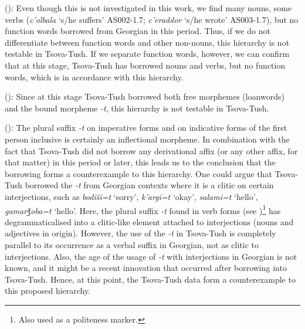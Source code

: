 \begin{description}[font=\normalfont]
	\item[\emph{Nouns > non-nouns, function words}] (\cite[208]{matras2011universals}): Even though this is not investigated in this work, we find many nouns, some verbs (\textit{c'olbala} `s/he suffers' AS002-1.7; \textit{c'eraddor} `s/he wrote' AS003-1.7), but no function words borrowed from Georgian in this period. Thus, if we do not differentiate between function words and other non-nouns, this hierarchy is not testable in Tsova-Tush. If we separate function words, however, we can confirm that at this stage, Tsova-Tush has borrowed nouns and verbs, but no function words, which is in accordance with this hierarchy.
	
	\item[\emph{Free morphemes > bound morphemes}]  (\cite[208]{matras2011universals}): Since at this stage Tsova-Tush borrowed both free morphemes (loanwords) and the bound morpheme \textit{-t}, this hierarchy is not testable in Tsova-Tush.
	
	\item[\emph{Derivational morphology > inflectional morphology}] (\cite[208]{matras2011universals}): The plural suffix \textit{-t} on imperative forms and on indicative forms of the first person inclusive is certainly an inflectional morpheme. In combination with the fact that Tsova-Tush did not borrow any derivational affix (or any other affix, for that matter) in this period or later, this leads us to the conclusion that the borrowing forms a counterexample to this hierarchy. One could argue that Tsova-Tush borrowed the \textit{-t} from Georgian contexts where it is a clitic on certain interjections, such as \textit{bodiši=t} `sorry', \textit{k'argi=t} `okay', \textit{salami=t} `hello', \textit{gamarǯoba=t} `hello'. Here, the plural suffix \textit{-t} found in verb forms (see )\footnote{Also used as a politeness marker.} has degrammaticalised into a clitic-like element attached to interjections (nouns and adjectives in origin). However, the use of the \textit{-t} in Tsova-Tush is completely parallel to its occurrence as a verbal suffix in Georgian, not as clitic to interjections. Also, the age of the usage of \textit{-t} with interjections in Georgian is not known, and it might be a recent innovation that occurred after borrowing into Tsova-Tush. Hence, at this point, the Tsova-Tush data form a counterexample to this proposed hierarchy.
	

\end{description}
